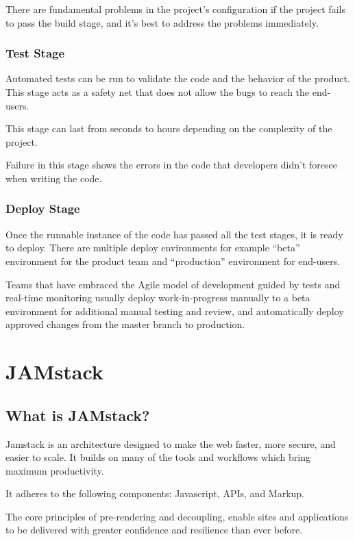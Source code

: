 There are fundamental problems in the project's configuration if the project fails to pass the build 
stage, and it’s best to address the problems immediately.

\subsubsection{Test Stage}

Automated tests can be run to validate the code and the behavior of the product. This stage acts as a safety
net that does not allow the bugs to reach the end-users.

This stage can last from seconds to hours depending on the complexity of the project.

Failure in this stage shows the errors in the code that developers didn't foresee when writing the code.

\subsubsection{Deploy Stage}

Once the runnable instance of the code has passed all the test stages, it is ready to deploy. There are 
multiple deploy environments for example “beta” environment for the product team and “production” 
environment for end-users.

Teams that have embraced the Agile model of development guided by tests and real-time monitoring usually 
deploy work-in-progress manually to a beta environment for additional manual testing and review, and 
automatically deploy approved changes from the master branch to production.

\section{JAMstack}

\subsection{What is JAMstack?}

Jamstack is an architecture designed to make the web faster, more secure, and easier to scale. 
It builds on many of the tools and workflows which bring maximum productivity.

It adheres to the following components: Javascript, APIs, and Markup.

The core principles of pre-rendering and decoupling, enable sites and applications to be delivered 
with greater confidence and resilience than ever before.~\cite{JAMstack}

